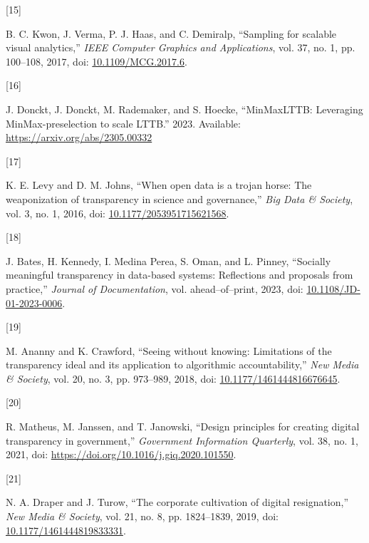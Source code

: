 \documentclass{article}
\newlength{\cslhangindent}
\newlength{\csllabelwidth}
\newlength{\cslentryspacingunit} %
\newenvironment{CSLReferences}[2] %
 {%
  \setlength{\parindent}{0pt}
  \ifodd #1
  \let\oldpar\par
  \def\par{\hangindent=\cslhangindent\oldpar}
  \fi
  \setlength{\parskip}{#2\cslentryspacingunit}
 }%
 {}
\newcommand{\CSLLeftMargin}[1]{\parbox[t]{\csllabelwidth}{#1}}
\newcommand{\CSLRightInline}[1]{\parbox[t]{\linewidth - \csllabelwidth}{#1}\break}
\begin{document}
\begin{CSLReferences}{0}{0}
\leavevmode{}%
\CSLLeftMargin{{[}15{]} }%
\CSLRightInline{B. C. Kwon, J. Verma, P. J. Haas, and C. Demiralp,
{``Sampling for scalable visual analytics,''} \emph{IEEE Computer
Graphics and Applications}, vol. 37, no. 1, pp. 100--108, 2017, doi:
\href{https://doi.org/10.1109/MCG.2017.6}{10.1109/MCG.2017.6}.}

\leavevmode{}%
\CSLLeftMargin{{[}16{]} }%
\CSLRightInline{J. Donckt, J. Donckt, M. Rademaker, and S. Hoecke,
{``MinMaxLTTB: Leveraging MinMax-preselection to scale LTTB.''} 2023.
Available: \url{https://arxiv.org/abs/2305.00332}}

\leavevmode{}%
\CSLLeftMargin{{[}17{]} }%
\CSLRightInline{K. E. Levy and D. M. Johns, {``When open data is a
trojan horse: The weaponization of transparency in science and
governance,''} \emph{Big Data \& Society}, vol. 3, no. 1, 2016, doi:
\href{https://doi.org/10.1177/2053951715621568}{10.1177/2053951715621568}.}

\leavevmode{}%
\CSLLeftMargin{{[}18{]} }%
\CSLRightInline{J. Bates, H. Kennedy, I. Medina Perea, S. Oman, and L.
Pinney, {``Socially meaningful transparency in data-based systems:
Reflections and proposals from practice,''} \emph{Journal of
Documentation}, vol. ahead--of--print, 2023, doi:
\href{https://doi.org/10.1108/JD-01-2023-0006}{10.1108/JD-01-2023-0006}.}

\leavevmode{}%
\CSLLeftMargin{{[}19{]} }%
\CSLRightInline{M. Ananny and K. Crawford, {``Seeing without knowing:
Limitations of the transparency ideal and its application to algorithmic
accountability,''} \emph{New Media \& Society}, vol. 20, no. 3, pp.
973--989, 2018, doi:
\href{https://doi.org/10.1177/1461444816676645}{10.1177/1461444816676645}.}

\leavevmode{}%
\CSLLeftMargin{{[}20{]} }%
\CSLRightInline{R. Matheus, M. Janssen, and T. Janowski, {``Design
principles for creating digital transparency in government,''}
\emph{Government Information Quarterly}, vol. 38, no. 1, 2021, doi:
\url{https://doi.org/10.1016/j.giq.2020.101550}.}

\leavevmode{}%
\CSLLeftMargin{{[}21{]} }%
\CSLRightInline{N. A. Draper and J. Turow, {``The corporate cultivation
of digital resignation,''} \emph{New Media \& Society}, vol. 21, no. 8,
pp. 1824--1839, 2019, doi:
\href{https://doi.org/10.1177/1461444819833331}{10.1177/1461444819833331}.}


\end{CSLReferences}
\end{document}
